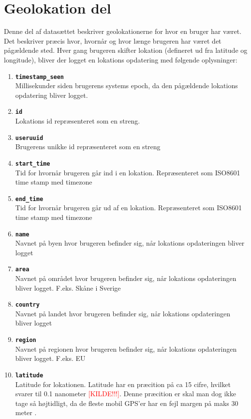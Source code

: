 \section{Geolokation del}
Denne del af datasættet beskriver geolokationerne for hvor en bruger har været. Det beskriver præcis hvor, hvornår og hvor længe brugeren har været det pågældende sted. Hver gang brugeren skifter lokation (defineret ud fra latitude og longitude), bliver der logget en lokations opdatering med følgende oplysninger:
\begin{enumerate}
\item \texttt{\textbf{timestamp\_seen}}\\Millisekunder siden brugerens systems epoch, da den pågældende lokations opdatering bliver logget. 
\item \texttt{\textbf{id}}\\Lokations id repræsenteret som en streng. 
\item \texttt{\textbf{useruuid}}\\Brugerens unikke id repræsenteret som en streng
\item \texttt{\textbf{start\_time}}\\Tid for hvornår brugeren går ind i en lokation. Repræsenteret som ISO8601 time stamp med timezone
\item \texttt{\textbf{end\_time}}\\Tid for hvornår brugeren går ud af en lokation. Repræsenteret som ISO8601 time stamp med timezone
\item \texttt{\textbf{name}}\\Navnet på byen hvor brugeren befinder sig, når lokations opdateringen bliver logget
\item \texttt{\textbf{area}}\\Navnet på området hvor brugeren befinder sig, når lokations opdateringen bliver logget. F.eks. Skåne i Sverige
\item \texttt{\textbf{country}}\\Navnet på landet hvor brugeren befinder sig, når lokations opdateringen bliver logget
\item \texttt{\textbf{region}}\\Navnet på regionen hvor brugeren befinder sig, når lokations opdateringen bliver logget. F.eks. EU
\item \texttt{\textbf{latitude}}\\Latitude for lokationen. Latitude har en præcition på ca 15 cifre, hvilket svarer til 0.1 nanometer \textcolor{red}{[KILDE!!!]}. Denne præcition er skal man dog ikke tage så højtidligt, da de fleste mobil GPS'er har en fejl margen på maks 30 meter \cite{NAV:8292634}.  

\end{enumerate}
